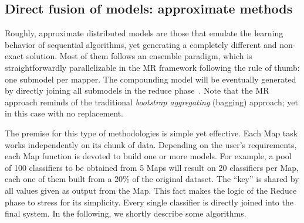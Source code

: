 \documentclass[3p,review]{elsarticle}
\begin{document}
	
	\subsection{Direct fusion of models: approximate methods}\label{subsec:approx}
	
	Roughly, approximate distributed models are those that emulate the learning behavior of sequential algorithms, yet generating a completely different and non-exact solution. Most of them follows an ensemble paradigm, which is straightforwardly parallelizable in the MR framework following the rule of thumb: one submodel per mapper. The compounding model will be eventually generated by directly joining all submodels in the reduce phase~\cite{Polikar2006}. Note that the MR approach reminds of the traditional \textit{bootstrap aggregating} (bagging) approach; yet in this case with no replacement. 
	
	The premise for this type of methodologies is simple yet effective. Each Map task works independently on its chunk of data. Depending on the user's requirements, each Map function is devoted to build one or more models. For example, a pool of 100 classifiers to be obtained from 5 Maps will result on 20 classifiers per Map, each one of them built from a 20\% of the original dataset. The ``key'' is shared by all values given as output from the Map. This fact makes the logic of the Reduce phase to stress for its simplicity. Every single classifier is directly joined into the final system. In the following, we shortly describe some algorithms. 
	
\end{document}
